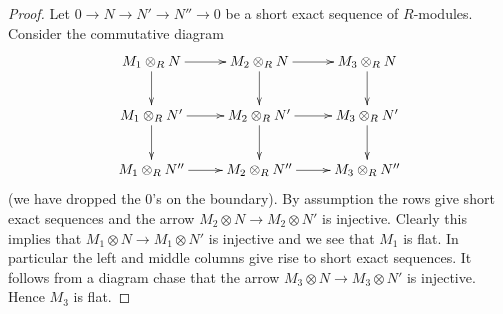 \documentclass[10pt,a4paper]{amsart}
\theoremstyle{plain}
\theoremstyle{definition}
\theoremstyle{remark}
\numberwithin{equation}{subsection}
\begin{document}
\begin{proof}
Let $0 \to N \to N' \to N'' \to 0$ be a short exact sequence of
$R$-modules. Consider the commutative diagram
$$
\xymatrix{
M_1 \otimes_R N \ar[r] \ar[d] &
M_2 \otimes_R N \ar[r] \ar[d] &
M_3 \otimes_R N \ar[d] \\
M_1 \otimes_R N' \ar[r] \ar[d] &
M_2 \otimes_R N' \ar[r] \ar[d] &
M_3 \otimes_R N' \ar[d] \\
M_1 \otimes_R N'' \ar[r] &
M_2 \otimes_R N'' \ar[r] &
M_3 \otimes_R N''
}
$$
(we have dropped the $0$'s on the boundary).
By assumption the rows give short exact sequences and the arrow
$M_2 \otimes N \to M_2 \otimes N'$ is injective. Clearly this implies
that $M_1 \otimes N \to M_1 \otimes N'$ is injective and we see that $M_1$
is flat. In particular the left and middle columns give rise to short
exact sequences. It follows from a diagram chase that the arrow
$M_3 \otimes N \to M_3 \otimes N'$ is injective. Hence $M_3$ is flat.
\end{proof}
\end{document}
